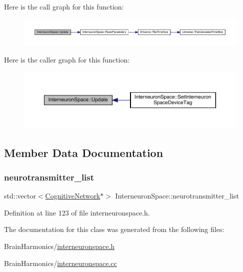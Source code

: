 Here is the call graph for this function\+:
\nopagebreak
\begin{figure}[H]
\begin{center}
\leavevmode
\includegraphics[width=350pt]{class_interneuron_space_a72ce2431e1348dd2558fa9b8f864d306_cgraph}
\end{center}
\end{figure}
Here is the caller graph for this function\+:
\nopagebreak
\begin{figure}[H]
\begin{center}
\leavevmode
\includegraphics[width=350pt]{class_interneuron_space_a72ce2431e1348dd2558fa9b8f864d306_icgraph}
\end{center}
\end{figure}


\subsection{Member Data Documentation}
\mbox{\label{class_interneuron_space_a51d51c2f71f6fcf65c478aa27457c4a3}} 
\subsubsection{\texorpdfstring{neurotransmitter\+\_\+list}{neurotransmitter\_list}}
{\footnotesize\ttfamily std\+::vector$<$\hyperlink{class_cognitive_network}{Cognitive\+Network}$\ast$$>$ Interneuron\+Space\+::neurotransmitter\+\_\+list\hspace{0.3cm}{\ttfamily [protected]}}



Definition at line 123 of file interneuronspace.\+h.



The documentation for this class was generated from the following files\+:\begin{DoxyCompactItemize}
\item 
Brain\+Harmonics/\hyperlink{interneuronspace_8h}{interneuronspace.\+h}\item 
Brain\+Harmonics/\hyperlink{interneuronspace_8cc}{interneuronspace.\+cc}\end{DoxyCompactItemize}
